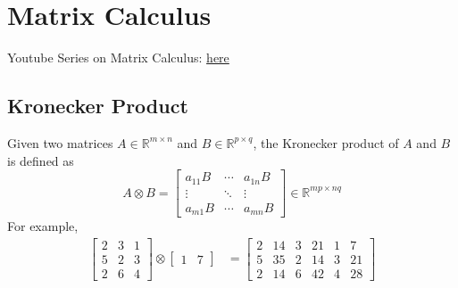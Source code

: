 \newpage
\section{Matrix Calculus}
Youtube Series on Matrix Calculus: \href{https://youtube.com/playlist?list=PLhcN-s3_Z7-YS6ltpJhjwqvHO1TYDbiZv&feature=shared}{here}
\subsection{Kronecker Product}
Given two matrices $A \in \mathbb R^{m \times n}$ and $B \in \mathbb R^{p \times q}$, the Kronecker product of $A$ and $B$ is defined as
$$A \otimes B = \begin{bmatrix}a_{11}B & \cdots & a_{1n}B \\ \vdots & \ddots & \vdots \\ a_{m1}B & \cdots & a_{mn}B\end{bmatrix} \in \mathbb R^{mp \times nq}$$ 
For example,
\begin{align*}
    \begin{bmatrix}
        2 & 3 & 1 \\
        5 & 2 & 3 \\
        2 & 6 & 4
    \end{bmatrix} \otimes \begin{bmatrix}
        1 & 7
    \end{bmatrix} &= \begin{bmatrix}
        2 & 14 & 3 & 21 & 1 & 7 \\
        5 & 35 & 2 & 14 & 3 & 21 \\
        2 & 14 & 6 & 42 & 4 & 28
    \end{bmatrix}
\end{align*}

